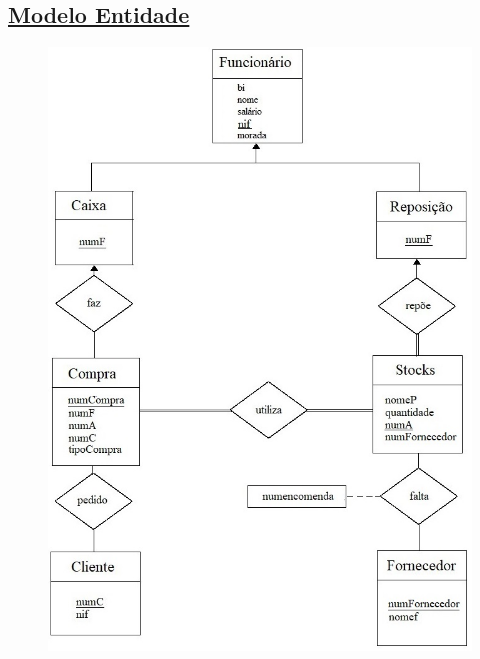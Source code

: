 \documentclass[12pt]{article}
\begin{document}
\begin{titlepage}
\section*{\underline{Modelo Entidade}}
\begin{figure}[h]
\begin{center}
\includegraphics[scale=0.845]{ModeloBD.jpg}
\end{center}
\end{figure}
\end{titlepage}
\end{document}
